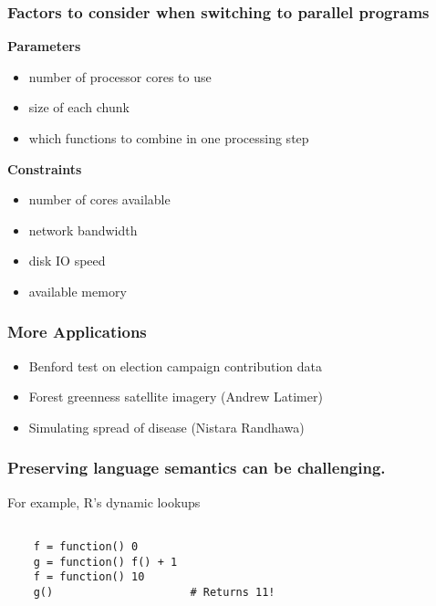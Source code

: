 \documentclass{beamer}
\begin{document}
\begin{frame}

    \frametitle{Factors to consider when switching to parallel programs}


\textbf{Parameters}
\begin{itemize}
    \item number of processor cores to use
    \item size of each chunk
    \item which functions to combine in one processing step
\end{itemize}

\textbf{Constraints}
\begin{itemize}
    \item number of cores available
    \item network bandwidth
    \item disk IO speed
    \item available memory
\end{itemize}

\end{frame}
\begin{frame}

    \frametitle{More Applications}


\begin{itemize}
    \item Benford test on election campaign contribution data
    \item Forest greenness satellite imagery (Andrew Latimer)
    \item Simulating spread of disease (Nistara Randhawa)
\end{itemize}

\end{frame}
\begin{frame}[fragile]

   \frametitle{Preserving language semantics can be challenging.}

    For example, R's dynamic lookups 

\begin{verbatim}

    f = function() 0
    g = function() f() + 1
    f = function() 10
    g()                     # Returns 11!

\end{verbatim}

\end{frame}
\end{document}
